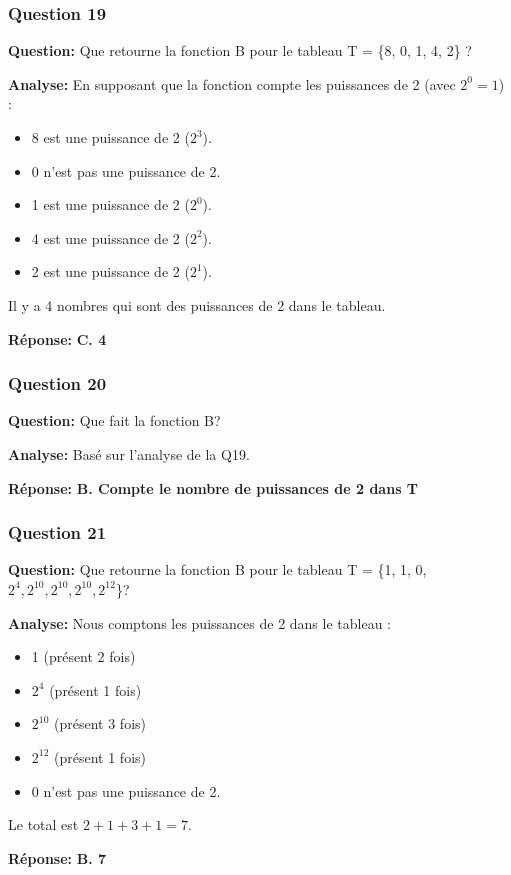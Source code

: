 \documentclass[12pt,a4paper]{article}
\begin{document}
\subsubsection{Question 19}
\textbf{Question:} Que retourne la fonction B pour le tableau T = \{8, 0, 1, 4, 2\} ?

\textbf{Analyse:} En supposant que la fonction compte les puissances de 2 (avec $2^0=1$) :
\begin{itemize}
    \item 8 est une puissance de 2 ($2^3$).
    \item 0 n'est pas une puissance de 2.
    \item 1 est une puissance de 2 ($2^0$).
    \item 4 est une puissance de 2 ($2^2$).
    \item 2 est une puissance de 2 ($2^1$).
\end{itemize}
Il y a 4 nombres qui sont des puissances de 2 dans le tableau.

\textbf{Réponse:} \textbf{C. 4}

\subsubsection{Question 20}
\textbf{Question:} Que fait la fonction B?

\textbf{Analyse:} Basé sur l'analyse de la Q19.

\textbf{Réponse:} \textbf{B. Compte le nombre de puissances de 2 dans T}

\subsubsection{Question 21}
\textbf{Question:} Que retourne la fonction B pour le tableau T = \{1, 1, 0, $2^4, 2^{10}, 2^{10}, 2^{10}, 2^{12}$\}?

\textbf{Analyse:} Nous comptons les puissances de 2 dans le tableau :
\begin{itemize}
    \item 1 (présent 2 fois)
    \item $2^4$ (présent 1 fois)
    \item $2^{10}$ (présent 3 fois)
    \item $2^{12}$ (présent 1 fois)
    \item 0 n'est pas une puissance de 2.
\end{itemize}
Le total est $2 + 1 + 3 + 1 = 7$.

\textbf{Réponse:} \textbf{B. 7}
\end{document}
